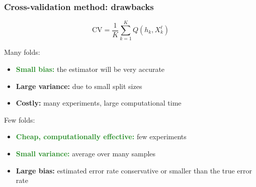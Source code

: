 \documentclass[usenames,dvipsnames,aspectratio=169]{beamer}
\begin{document}





\begin{frame}
\frametitle{Cross-validation method: drawbacks}

\[
\mathrm{CV} = \frac 1 K \sum\limits_{k=1}^K Q(h_k, X^{\ell}_k)
\]

Many folds:
\begin{itemize}
  \item \textcolor{ForestGreen}{\textbf{Small bias:}} the estimator will be very accurate
  \item \textcolor{BrickRed}{\textbf{Large variance:}} due to small split sizes
  \item \textcolor{BrickRed}{\textbf{Costly:}} many experiments, large computational time 
\end{itemize}

\pause
Few folds:
\begin{itemize}
  \item \textcolor{ForestGreen}{\textbf{Cheap, computationally effective:}} few experiments
  \item \textcolor{ForestGreen}{\textbf{Small variance:}} average over many samples
  \item \textcolor{BrickRed}{\textbf{Large bias:}} estimated error rate conservative
  or smaller than the true error rate
\end{itemize}

\end{frame}








    
\end{document}
